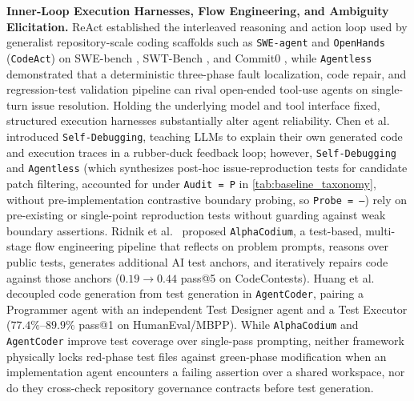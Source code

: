 \documentclass[11pt,a4paper,copyright]{google}
\begin{document}
\textbf{Inner-Loop Execution Harnesses, Flow Engineering, and Ambiguity Elicitation.} ReAct \cite{yao2023react} established the interleaved reasoning and action loop used by generalist repository-scale coding scaffolds such as \texttt{SWE-agent} \cite{yang2024sweagent} and \texttt{OpenHands} (\texttt{CodeAct}) \cite{wang2024openhands} on SWE-bench \cite{jimenez2024swebench}, SWT-Bench \cite{mundler2024swtbench}, and Commit0 \cite{zhao2024commit0}, while \texttt{Agentless} \cite{xia2024agentless} demonstrated that a deterministic three-phase fault localization, code repair, and regression-test validation pipeline can rival open-ended tool-use agents on single-turn issue resolution. Holding the underlying model and tool interface fixed, structured execution harnesses substantially alter agent reliability. Chen et al.\ \cite{chen2024selfdebug} introduced \texttt{Self-Debugging}, teaching LLMs to explain their own generated code and execution traces in a rubber-duck feedback loop; however, \texttt{Self-Debugging} and \texttt{Agentless} (which synthesizes post-hoc issue-reproduction tests for candidate patch filtering, accounted for under \texttt{Audit = P} in \cref{tab:baseline_taxonomy}, without pre-implementation contrastive boundary probing, so \texttt{Probe = --}) rely on pre-existing or single-point reproduction tests without guarding against weak boundary assertions. Ridnik et al.\ \cite{ridnik2024alphacodium} proposed \texttt{AlphaCodium}, a test-based, multi-stage flow engineering pipeline that reflects on problem prompts, reasons over public tests, generates additional AI test anchors, and iteratively repairs code against those anchors ($0.19 \to 0.44$ pass@5 on CodeContests). Huang et al.\ \cite{huang2024agentcoder} decoupled code generation from test generation in \texttt{AgentCoder}, pairing a Programmer agent with an independent Test Designer agent and a Test Executor ($77.4\%$--$89.9\%$ pass@1 on HumanEval/MBPP). While \texttt{AlphaCodium} and \texttt{AgentCoder} improve test coverage over single-pass prompting, neither framework physically locks red-phase test files against green-phase modification when an implementation agent encounters a failing assertion over a shared workspace, nor do they cross-check repository governance contracts before test generation.
\end{document}
